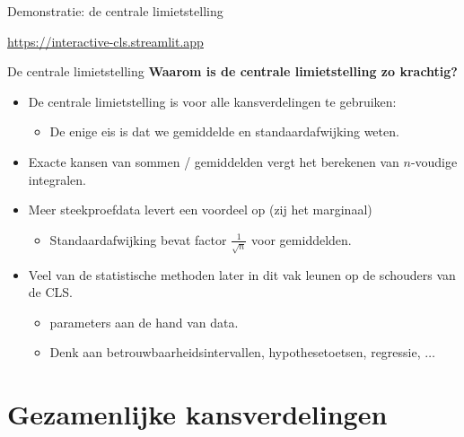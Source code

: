     \begin{frame}{Demonstratie: de centrale limietstelling}
        \begin{center}
            \Huge\url{https://interactive-cls.streamlit.app}
        \end{center}
    \end{frame}

    \begin{frame}{De centrale limietstelling}
        \textbf{Waarom is de centrale limietstelling zo krachtig?}
        \begin{itemize}\setlength\itemsep{2em}
            \item De centrale limietstelling is voor alle kansverdelingen te gebruiken:
            \begin{itemize}
                \item De enige eis is dat we gemiddelde en standaardafwijking weten.
            \end{itemize}\pause
            \item Exacte kansen van sommen / gemiddelden vergt het berekenen van $n$-voudige integralen.\pause
            \item Meer steekproefdata levert een voordeel op (zij het marginaal)
            \begin{itemize}
                \item Standaardafwijking bevat factor $\frac{1}{\sqrt{n}}$ voor gemiddelden.
            \end{itemize} \pause
            \item Veel van de statistische methoden later in dit vak leunen op de schouders van de CLS.
            \begin{itemize}
                \item {}parameters aan de hand van data.
                \item Denk aan betrouwbaarheidsintervallen, hypothesetoetsen, regressie, $\ldots$
            \end{itemize}
        \end{itemize}
    \end{frame}

\section{Gezamenlijke kansverdelingen}

